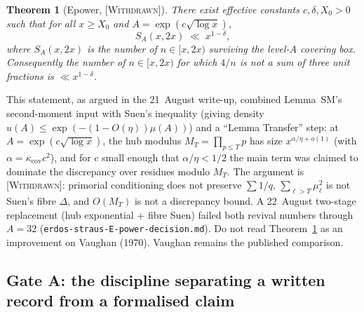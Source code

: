 \documentclass[11pt]{article}
\theoremstyle{plain}
\newtheorem{theorem}{Theorem}[section]
\theoremstyle{definition}
\theoremstyle{remark}
\newcommand{\WITHDRAWN}{\textcolor{negative}{\textsc{[Withdrawn]}}}
\renewcommand{\_}{\textunderscore\allowbreak}
\begin{document}
\begin{theorem}[E\_power, \WITHDRAWN]
\label{thm:epower}
There exist effective constants $c,\delta,X_0>0$ such that for all $x\ge X_0$ and
$A=\exp(c\sqrt{\log x})$,
\[
S_A(x,2x) \;\ll\; x^{1-\delta},
\]
where $S_A(x,2x)$ is the number of $n\in[x,2x)$ surviving the level-$A$ covering box.
Consequently the number of $n\in[x,2x)$ for which $4/n$ is \emph{not} a sum of three unit
fractions is $\ll x^{1-\delta}$.
\end{theorem}
This statement, as argued in the 21~August write-up, combined Lemma~SM's second-moment input
with Suen's inequality (giving density $u(A)\le\exp(-(1-O(\eta))\mu(A))$) and a
``Lemma Transfer'' step: at $A=\exp(c\sqrt{\log x})$, the hub modulus
$M_T=\prod_{p\le T}p$ has size $x^{\alpha/\eta+o(1)}$
(with $\alpha=\kappa_{\mathrm{cov}}c^2$), and for $c$ small enough that $\alpha/\eta<1/2$ the
main term was claimed to dominate the discrepancy over residues modulo $M_T$.
The argument is \WITHDRAWN{}: primorial conditioning does not preserve $\sum 1/q$,
$\sum_{\ell>T}\mu_\ell^2$ is not Suen's fibre $\Delta$, and $O(M_T)$ is not a
discrepancy bound. A 22~August two-stage replacement (hub exponential + fibre Suen)
failed both revival numbers through $A=32$
(\texttt{erdos-straus-E-power-decision.md}). Do not read Theorem~\ref{thm:epower}
as an improvement on Vaughan (1970). Vaughan remains the published comparison.

\subsection{Gate A: the discipline separating a written record from a formalised claim}
\label{subsec:gatea}
\end{document}
